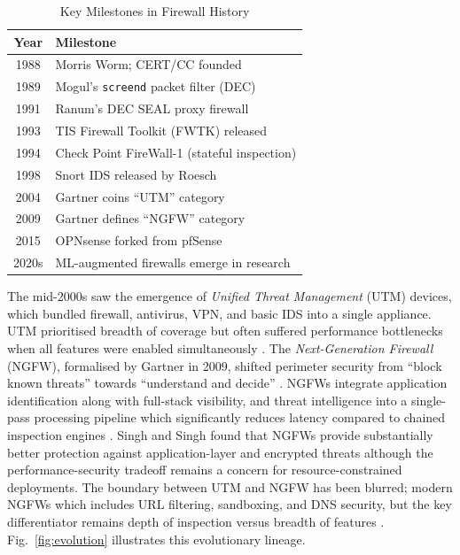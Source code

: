 \documentclass[conference]{IEEEtran}
\begin{document}
\begin{table}[!t]
\centering
\caption{Key Milestones in Firewall History}
\label{tab:timeline}
\renewcommand{\arraystretch}{1.15}
\small
\begin{tabularx}{\columnwidth}{c|X}
\toprule
\textbf{Year} & \textbf{Milestone} \\
\midrule
1988 & Morris Worm; CERT/CC founded \\
1989 & Mogul's \texttt{screend} packet filter (DEC) \\
1991 & Ranum's DEC SEAL proxy firewall \\
1993 & TIS Firewall Toolkit (FWTK) released \\
1994 & Check Point FireWall-1 (stateful inspection) \\
1998 & Snort IDS released by Roesch \cite{roesch1999snort} \\
2004 & Gartner coins ``UTM'' category \\
2009 & Gartner defines ``NGFW'' category \\
2015 & OPNsense forked from pfSense \\
2020s & ML-augmented firewalls emerge in research \\
\bottomrule
\end{tabularx}
\end{table}

The mid-2000s saw the emergence of \textit{Unified Threat Management} (UTM) devices, which bundled firewall, antivirus, VPN, and basic IDS into a single appliance. UTM prioritised breadth of coverage but often suffered performance bottlenecks when all features were enabled simultaneously \cite{neupane2018ngfw}. The \textit{Next-Generation Firewall} (NGFW), formalised by Gartner in 2009, shifted perimeter security from ``block known threats'' towards ``understand and decide'' \cite{liang2022evolution}. NGFWs integrate application identification along with full-stack visibility, and threat intelligence into a single-pass processing pipeline which significantly reduces latency compared to chained inspection engines \cite{heino2022endpoint}. Singh and Singh \cite{singh2024comparative} found that NGFWs provide substantially better protection against application-layer and encrypted threats although the performance-security tradeoff remains a concern for resource-constrained deployments. The boundary between UTM and NGFW has been blurred; modern NGFWs which includes URL filtering, sandboxing, and DNS security, but the key differentiator remains depth of inspection versus breadth of features \cite{neupane2018ngfw}. Fig.~\ref{fig:evolution} illustrates this evolutionary lineage.
\end{document}
